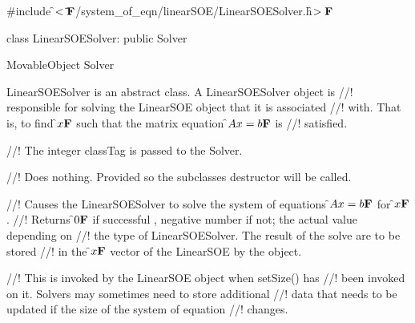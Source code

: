 
\indent \#include \f$<\tilde{ }{\bf F}$/system\_of\_eqn/linearSOE/LinearSOESolver.h\f$>{\bf F}$

\indent class LinearSOESolver: public Solver

\indent MovableObject
\indent\indent  Solver
\indent\indent{}

\indent LinearSOESolver is an abstract class. A LinearSOESolver object is
//! responsible for solving the LinearSOE object that it is associated
//! with. That is, to find \f$x{\bf F}$ such that the matrix equation \f$Ax=b{\bf F}$ is
//! satisfied.

\indent{}
\indent{}
\indent{}
\indent{}
\indent{}
\indent{}
\indent{}

//! The integer \p classTag is passed to the Solver.

//! Does nothing. Provided so the subclasses destructor will be called.

//! Causes the LinearSOESolver to solve the system of equations \f$Ax=b{\bf F}$ for \f$x{\bf F}$.
//! Returns \f$0{\bf F}$ if successful , negative number if not; the actual value depending on
//! the type of LinearSOESolver. The result of the solve are to be stored
//! in the \f$x{\bf F}$ vector of the LinearSOE by the object.

//! This is invoked by the \p LinearSOE object when setSize() has
//! been invoked on it. Solvers may sometimes need to store additional
//! data that needs to be updated if the size of the system of equation
//! changes.




